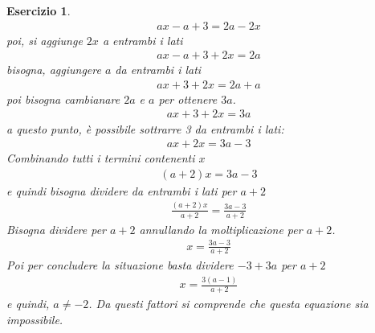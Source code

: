 \documentclass{book}
\newtheorem{es}[section]{Esercizio}
\begin{document}
\begin{es}
  \begin{eqnarray*}
    ax-a+3=2a-2x
  \end{eqnarray*}
  poi, si aggiunge $2x$ a entrambi i lati
  \begin{eqnarray*}
    ax-a+3+2x=2a
  \end{eqnarray*}
  bisogna, aggiungere $a$ da entrambi i lati
  \begin{eqnarray*}
    ax+3+2x=2a+a
  \end{eqnarray*}
  poi bisogna cambianare $2a$ e $a$ per ottenere $3a$.
  \begin{eqnarray*}
    ax+3+2x=3a
  \end{eqnarray*}
  a questo punto, è possibile sottrarre 3 da entrambi i lati:
  \begin{eqnarray*}
    ax+2x=3a-3
  \end{eqnarray*}
  Combinando tutti i termini contenenti $x$
  \begin{eqnarray*}
    (a+2)x=3a-3
  \end{eqnarray*}
  e quindi bisogna dividere da entrambi i lati per $a+2$
  \begin{eqnarray*}
    \frac{(a+2)x}{a+2}=\frac{3a-3}{a+2}
  \end{eqnarray*}
  Bisogna dividere per $a+2$ annullando la moltiplicazione per $a+2$.
  \begin{eqnarray*}
    x=\frac{3a-3}{a+2}
  \end{eqnarray*}
  Poi per concludere la situazione basta dividere $-3+3a$ per $a+2$
  \begin{eqnarray*}
    x=\frac{3(a-1)}{a+2}
  \end{eqnarray*}
  e quindi, $a\neq -2$. Da questi fattori si comprende che questa equazione
  sia impossibile.
\end{es}
\clearpage
\end{document}

